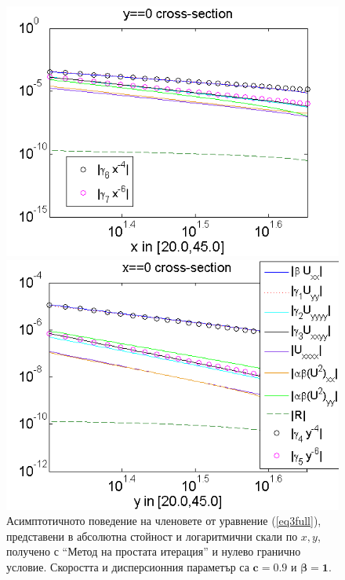 \documentclass[a4paper]{article}
\newcommand{\rf}[1]{(\ref{#1})}
\theoremstyle{remark}
\begin{document}
\begin{figure}[ht]	
	\begin{minipage}[b]{0.95\linewidth}
		\raggedleft
		\includegraphics[width=\linewidth]{AssymptForEachTerm/bt1_c010_090/ChristovIC_AlongX_50_ZB2_bt1_c090_h020_O(h^6).png}
	\end{minipage}
	\begin{minipage}[b]{0.95\linewidth}
		 \raggedright
		\includegraphics[width=\linewidth]{AssymptForEachTerm/bt1_c010_090/ChristovIC_AlongY_50_ZB2_bt1_c090_h020_O(h^6).png}
	\end{minipage}
	\caption{Асимптотичното поведение на членовете от уравнение \rf{eq3full}, представени в абсолютна стойност и логаритмични скали по $x,y$, получено с ``Метод на простата итерация'' и нулево гранично условие. Скоростта и дисперсионния параметър са $\boldsymbol{c=0.9}$ и $\boldsymbol{\beta = 1}$. }
	\label{fig:assympt_beta1c09}
\end{figure}
\FloatBarrier
\end{document}
